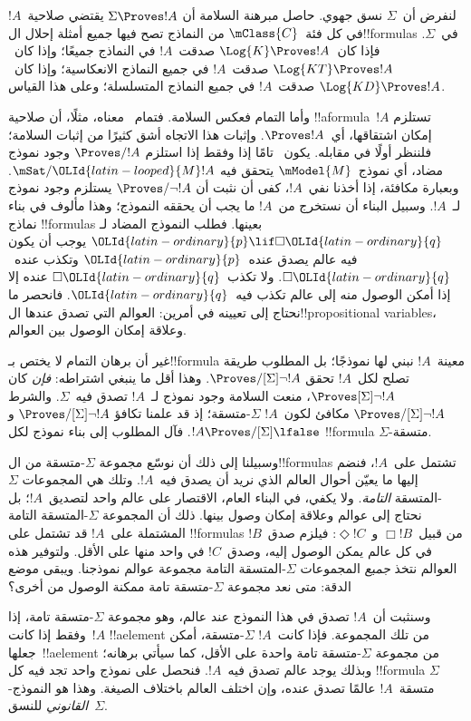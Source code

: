 \documentclass[../../../include/open-logic-section]{subfiles}
\begin{document}


لنفرض أن~$\Sigma$ نسق جهوي. حاصل مبرهنة السلامة أن
$\Sigma \Proves !A$ يقتضي صلاحية~$!A$ في كل فئة~$\mClass{C}$ من
النماذج تصح فيها جميع أمثلة إحلال ال!!{formula}s في~$\Sigma$.
فإذا كان~$\Log{K} \Proves !A$ صدقت~$!A$ في النماذج جميعًا؛
وإذا كان~$\Log{KT} \Proves !A$ صدقت~$!A$ في جميع النماذج الانعكاسية؛
وإذا كان~$\Log{KD} \Proves !A$ صدقت~$!A$ في جميع النماذج المتسلسلة؛
وعلى هذا القياس.

وأما التمام فعكس السلامة. فتمام~ معناه، مثلًا، أن صلاحية
!!a{formula}~$!A$ تستلزم إمكان اشتقاقها، أي~$\Proves !A$.
وإثبات هذا الاتجاه أشق كثيرًا من إثبات السلامة؛ فلننظر أولًا في مقابله.
يكون~ تامًا إذا وفقط إذا استلزم $\Proves/ !A$ وجود نموذج مضاد،
أي نموذج~$\mModel{M}$ يتحقق فيه $\mSat/{\OLId{latin-looped}{M}}{!A}$.
وبعبارة مكافئة، إذا أخذنا نفي~$!A$، كفى أن نثبت أن
$\Proves/ \lnot !A$ يستلزم وجود نموذج لـ~$!A$.
وسبيل البناء أن نستخرج من~$!A$ ما يجب أن يحققه النموذج؛ وهذا مألوف
في بناء نماذج !!{formula}s بعينها. فطلب النموذج المضاد لـ
$\OLId{latin-ordinary}{p} \lif \Box \OLId{latin-ordinary}{q}$ يوجب أن يكون فيه عالم يصدق عنده~$\OLId{latin-ordinary}{p}$ وتكذب عنده~$\Box \OLId{latin-ordinary}{q}$.
ولا تكذب~$\Box \OLId{latin-ordinary}{q}$ عنده إلا إذا أمكن الوصول منه إلى عالم تكذب فيه~$\OLId{latin-ordinary}{q}$.
فانحصر ما نحتاج إلى تعيينه في أمرين: العوالم التي تصدق عندها
ال!!{propositional variable}s، وعلاقة إمكان الوصول بين العوالم.

غير أن برهان التمام لا يختص بـ!!{formula} معينة~$!A$ نبني لها نموذجًا؛
بل المطلوب طريقة تصلح لكل~$!A$ تحقق $\Proves/[\Sigma] \lnot !A$.
وهذا أقل ما ينبغي اشتراطه: \emph{فإن} كان $\Proves[\Sigma] \lnot !A$،
منعت السلامة وجود نموذج لـ~$!A$ تصدق فيه~$\Sigma$.
والشرط $\Proves/[\Sigma] \lnot !A$ مكافئ لكون~$!A$ $\Sigma$-متسقة؛
إذ قد علمنا تكافؤ $\Proves/[\Sigma] \lnot !A$ و
$!A \Proves/[\Sigma] \lfalse$.
فآل المطلوب إلى بناء نموذج لكل !!{formula} $\Sigma$-متسقة.

وسبيلنا إلى ذلك أن نوسّع مجموعة $\Sigma$-متسقة من
ال!!{formula}s تشتمل على~$!A$، فنضم إليها ما يعيّن أحوال العالم
الذي نريد أن يصدق فيه~$!A$. وتلك هي المجموعات
$\Sigma$-المتسقة \emph{التامة}.
ولا يكفي، في البناء العام، الاقتصار على
عالم واحد لتصديق~$!A$؛ بل نحتاج إلى عوالم وعلاقة إمكان وصول بينها.
ذلك أن المجموعة $\Sigma$-المتسقة التامة المشتملة على~$!A$ قد تشتمل
على !!{formula}s من قبيل~$\Box !B$ و~$\Diamond !C$:
فيلزم صدق~$!B$ في كل عالم يمكن الوصول إليه، وصدق~$!C$ في واحد منها
على الأقل. ولتوفير هذه العوالم نتخذ \emph{جميع} المجموعات
$\Sigma$-المتسقة التامة مجموعة عوالم نموذجنا.
ويبقى موضع الدقة: متى نعد مجموعة $\Sigma$-متسقة تامة
ممكنة الوصول من أخرى؟

وسنثبت أن~$!A$ تصدق في هذا النموذج عند عالم، وهو مجموعة
$\Sigma$-متسقة تامة، إذا وفقط إذا كانت~$!A$ !!a{element} من تلك المجموعة.
فإذا كانت~$!A$ $\Sigma$-متسقة، أمكن جعلها~!!a{element} من مجموعة
$\Sigma$-متسقة تامة واحدة على الأقل، كما سيأتي برهانه؛ وبذلك يوجد
عالم تصدق فيه~$!A$. فنحصل على نموذج واحد تجد فيه كل !!{formula}
$\Sigma$-متسقة~$!A$ عالمًا تصدق عنده، وإن اختلف العالم باختلاف الصيغة.
وهذا هو النموذج \emph{القانوني} للنسق~$\Sigma$.
\end{document}
